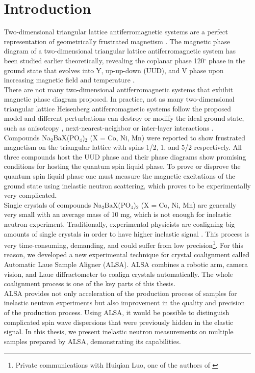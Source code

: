 \section*{Introduction}
Two-dimensional triangular lattice antiferromagnetic systems are a perfect 
representation of geometrically frustrated magnetism \cite{AFM_intro}. The 
magnetic phase diagram of a two-dimensional triangular lattice 
antiferromagnetic system has been studied earlier theoretically, revealing the 
coplanar phase 120$^{\circ}$ phase in the ground state that evolves into Y, up-up-down (UUD), 
and V phase upon increasing magnetic field and temperature
\cite{AFM_intro2}. \\
There are not many two-dimensional antiferromagnetic systems that exhibit 
magnetic phase diagram proposed. In practice, not as many two-dimensional 
triangular lattice Heisenberg antiferromagnetic systems follow the proposed 
model and  different perturbations can destroy or modify the ideal 
ground state, such as anisotropy \cite{anisotropy}, next-nearest-neighbor 
\cite{NNN} or inter-layer interactions \cite{NN_layer}. Compounds 
Na$_2$BaX(PO$_4$)$_2$ (X = Co, Ni, Mn) were reported to show frustrated 
magnetism on the triangular lattice with spins 1/2, 1, and 5/2 respectively. All 
three compounds host the UUD phase \cite{Na2BaCo(PO4)2_phase_diagram, 
NBNPO_phase_diagram, NBMPO_phase_diagram} and their phase diagrams show 
promising conditions for hosting the quantum spin liquid phase. To prove or 
disprove the quantum spin liquid phase one must measure the magnetic 
excitations of the ground state using inelastic neutron scattering, which proves 
to be experimentally very complicated.\\
Single crystals of compounds Na$_2$BaX(PO$_4$)$_2$ (X = Co, Ni, Mn) are 
generally very small with an average mass of 10 mg, which is not enough for 
inelastic neutron experiment. Traditionally, experimental physicists are 
coaligning big amounts of single crystals in order to have
higher inelastic signal \cite{krystaly_coaligment}. This process is very 
time-consuming, demanding, and could suffer from low precision\footnote{Private communications with Huiqian Luo, one of the authors of \cite{krystaly_coaligment}}. For this reason, we developed a new experimental technique for crystal coalignment called Automatic Laue Sample Aligner (ALSA). ALSA combines a robotic arm, camera vision, and Laue diffractometer to coalign crystals automatically. The whole coalignment process is one of the key parts of this thesis.\\
ALSA provides not only acceleration of the production process of samples for inelastic neutron experiments but also improvement in the quality and precision of the production process. Using ALSA, it would be possible to distinguish complicated spin wave dispersions that were previously hidden in the elastic signal. In this thesis, we present inelastic neutron measurements on multiple samples prepared by ALSA, demonstrating its capabilities. 







